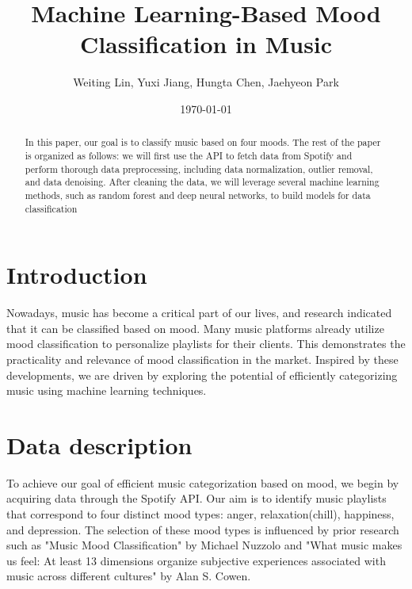 \documentclass{article}
\title{Machine Learning-Based Mood Classification in Music }
\author{Weiting Lin, Yuxi Jiang, Hungta Chen, Jaehyeon Park}
\date{\today}
\date{}
\begin{document}
\maketitle

\begin{abstract}
In this paper, our goal is to classify music based on four moods. The rest of the paper is organized as follows: we will first use the API to fetch data from Spotify and perform thorough data preprocessing, including data normalization, outlier removal, and data denoising. After cleaning the data, we will leverage several machine learning methods, such as random forest and deep neural networks, to build models for data classification
\end{abstract}


\section{Introduction}
Nowadays, music has become a critical part of our lives, and research indicated that it can be classified based on mood. Many music platforms already utilize mood classification to personalize playlists for their clients. This demonstrates the practicality and relevance of mood classification in the market. Inspired by these developments, we are driven by exploring the potential of efficiently categorizing music using machine learning techniques.

\section{Data description}
To achieve our goal of efficient music categorization based on mood, we begin by acquiring data through the Spotify API. Our aim is to identify music playlists that correspond to four distinct mood types: anger, relaxation(chill), happiness, and depression. The selection of these mood types is influenced by prior research such as "Music Mood Classification" by Michael Nuzzolo and "What music makes us feel: At least 13 dimensions organize subjective experiences associated with music across different cultures" by Alan S. Cowen.\\ 
\end{document}
